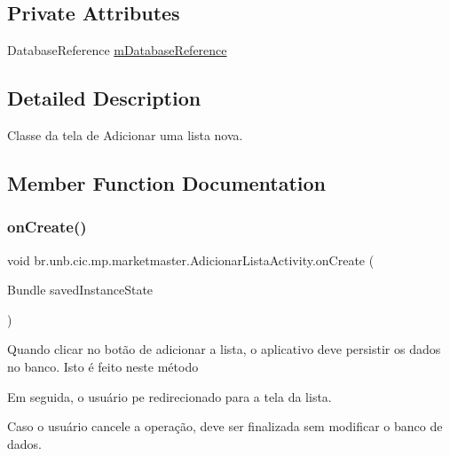 \subsection*{Private Attributes}
\begin{DoxyCompactItemize}
\item 
Database\+Reference \mbox{\hyperlink{classbr_1_1unb_1_1cic_1_1mp_1_1marketmaster_1_1AdicionarListaActivity_af058ae4b4f4085761aeb46fbcbddf8b1}{m\+Database\+Reference}}
\end{DoxyCompactItemize}


\subsection{Detailed Description}
Classe da tela de Adicionar uma lista nova. 

\subsection{Member Function Documentation}
\mbox{\label{classbr_1_1unb_1_1cic_1_1mp_1_1marketmaster_1_1AdicionarListaActivity_aae0a171062bb9c865e67d5fa336c167d}} 
\subsubsection{\texorpdfstring{on\+Create()}{onCreate()}}
{\footnotesize\ttfamily void br.\+unb.\+cic.\+mp.\+marketmaster.\+Adicionar\+Lista\+Activity.\+on\+Create (\begin{DoxyParamCaption}\item[{Bundle}]{saved\+Instance\+State }\end{DoxyParamCaption})\hspace{0.3cm}{\ttfamily [protected]}}

Quando clicar no botão de adicionar a lista, o aplicativo deve persistir os dados no banco. Isto é feito neste método

Em seguida, o usuário pe redirecionado para a tela da lista.

Caso o usuário cancele a operação, deve ser finalizada sem modificar o banco de dados.

